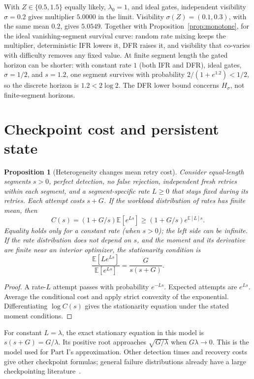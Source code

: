 \documentclass[11pt]{article}
\newtheorem{proposition}[theorem]{Proposition}
\theoremstyle{definition}
\theoremstyle{remark}
\newcommand{\E}{\mathbb E}
\begin{document}
With $Z\in\{0.5,1.5\}$ equally likely, $\lambda_0=1$, and ideal gates, independent visibility
$\sigma=0.2$ gives multiplier $5.0000$ in the limit. Visibility $\sigma(Z)=(0.1,0.3)$, with the
same mean $0.2$, gives $5.0549$. Together with Proposition~\ref{prop:monotone}, for the ideal
vanishing-segment survival curve: random rate mixing keeps the multiplier, deterministic IFR
lowers it, DFR raises it, and visibility that co-varies with difficulty removes any fixed value.
At finite segment length the gated horizon can be shorter: with constant rate $1$ (both IFR and
DFR), ideal gates, $\sigma=1/2$, and $s=1.2$, one segment survives with probability
$2/(1+e^{1.2})<1/2$, so the discrete horizon is $1.2<2\log2$. The DFR lower bound concerns
$H_\sigma$, not finite-segment horizons.

\section{Checkpoint cost and persistent state}\label{sec:cost}
\begin{proposition}[Heterogeneity changes mean retry cost]\label{prop:cost}
Consider equal-length segments $s>0$, perfect detection, no false rejection, independent fresh
retries within each segment, and a segment-specific rate $L\ge0$ that stays fixed during its
retries. Each attempt costs $s+G$. If the workload distribution of rates has finite mean, then
\[
C(s)=(1+G/s)\E[e^{Ls}]\ge(1+G/s)e^{\E[L]s}.
\]
Equality holds only for a constant rate (when $s>0$); the left side can be infinite.
If the rate distribution does not depend on $s$, and the moment and its derivative are finite
near an interior optimizer, the stationarity condition is
\begin{equation}\label{eq:checkpoint}
\frac{\E[L e^{Ls}]}{\E[e^{Ls}]}=\frac{G}{s(s+G)}.
\end{equation}
\end{proposition}
\begin{proof}
A rate-$L$ attempt passes with probability $e^{-Ls}$. Expected attempts are $e^{Ls}$.
Average the conditional cost and apply strict convexity of the exponential. Differentiating
$\log C(s)$ gives the stationarity equation under the stated moment conditions.
\end{proof}
For constant $L=\lambda$, the exact stationary equation in this model is
$s(s+G)=G/\lambda$. Its positive root approaches $\sqrt{G/\lambda}$ when $G\lambda\to0$.
This is the model used for Part I's approximation. Other detection times and recovery costs
give other checkpoint formulas; general failure distributions already have a large
checkpointing literature~\cite{toueg}.
\end{document}
